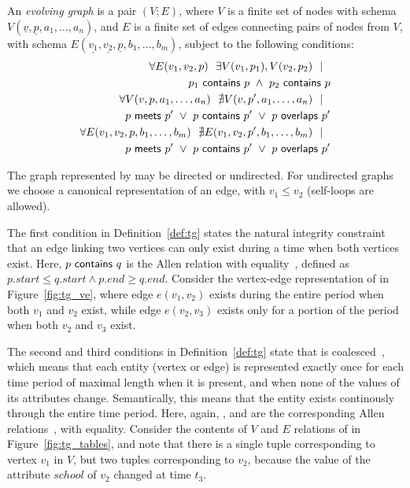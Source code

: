 \begin{definition}[TGraph]
An {\em evolving graph} \tg is a pair $(V; E)$, where $V$ is a finite
set of nodes with schema $V(\underline{v}, \underline{p}, a_1,
\ldots, a_n)$, and $E$ is a finite set of edges connecting pairs of
nodes from $V$, with schema $E(\underline{v_1}, \underline{v_2},
\underline{p}, b_1, \ldots, b_m)$, subject to the following
conditions:
\begin{align*}
\forall E(v_1, v_2, p)~~\exists V(v_1, p_1), V(v_2, p_2)~~|~~\\
                       p_1~\mathsf{contains}~p~\wedge~p_2~\mathsf{contains}~p\\
\forall V(v, p, a_1, \ldots, a_n)~~\nexists V(v, p', a_1, \ldots, a_n)~~|~~ \\
                       p~\mathsf{meets}~p'~\lor~p~\mathsf{contains}~p'~\lor~p~\mathsf{overlaps}~p'\\
\forall E(v_1, v_2, p,  b_1, \ldots, b_m)~~\nexists E(v_1,v_2, p', b_1, \ldots, b_m)~~|~~\\
                       p~\mathsf{meets}~p'~\lor~p~\mathsf{contains}~p'~\lor~p~\mathsf{overlaps}~p'
\end{align*}

\label{def:tg}
\end{definition}

The graph represented by \tg may be directed or undirected.  For
undirected graphs we choose a canonical representation of an edge, with
$v_1 \leq v_2$ (self-loops are allowed).

The first condition in Definition~\ref{def:tg} states the natural
integrity constraint that an edge linking two vertices can only exist
during a time when both vertices exist.  Here, $p~\mathsf{contains}~q$
is the Allen  relation with
equality~\cite{allen83}, defined as $p.start \leq q.start \wedge p.end
\geq q.end$.  Consider the vertex-edge representation of \tg
{} in Figure~\ref{fig:tg_ve}, where edge $e(v_1,v_2)$ exists
during the entire period when both $v_1$ and $v_2$ exist, while edge
$e(v_2,v_3)$ exists only for a portion of the period when both $v_2$
and $v_3$ exist.

The second and third conditions in Definition~\ref{def:tg} state that
\tg is coalesced~\cite{DBLP:conf/vldb/BohlenSS96}, which means that
each entity (vertex or edge) is represented exactly once for each time
period of maximal length when it is present, and when none of the
values of its attributes change.  Semantically, this means that the
entity exists continously through the entire time period.  Here,
again, ,  and 
are the corresponding Allen relations~\cite{allen83}, with
equality. Consider the contents of $V$ and $E$ relations of 
in Figure~\ref{fig:tg_tables}, and note that there is a single tuple
corresponding to vertex $v_1$ in $V$, but two tuples corresponding to
$v_2$, because the value of the attribute $school$ of $v_2$ changed at
time $t_3$.

